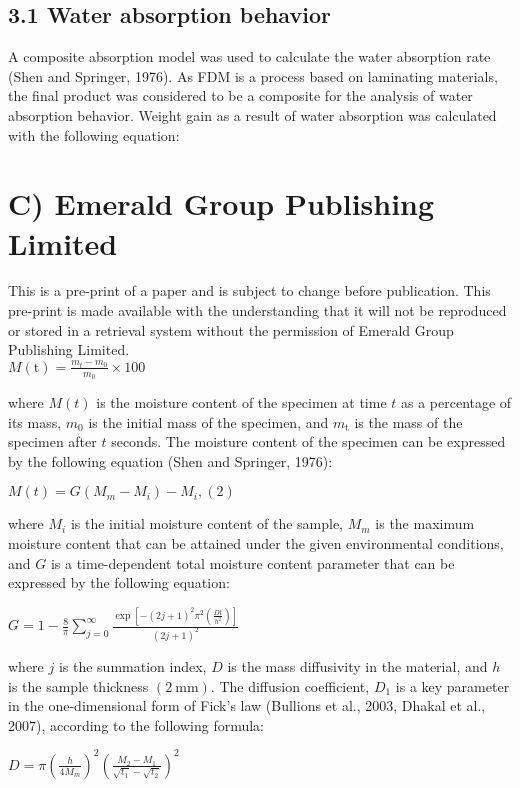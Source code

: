 \documentclass[10pt]{article}
\begin{document}
\subsection*{3.1 Water absorption behavior}
A composite absorption model was used to calculate the water absorption rate (Shen and Springer, 1976). As FDM is a process based on laminating materials, the final product was considered to be a composite for the analysis of water absorption behavior. Weight gain as a result of water absorption was calculated with the following equation:

\section*{C) Emerald Group Publishing Limited}
This is a pre-print of a paper and is subject to change before publication. This pre-print is made available with the understanding that it will not be reproduced or stored in a retrieval system without the permission of Emerald Group Publishing Limited.\\
$M(\mathrm{t})=\frac{m_{t}-m_{0}}{m_{0}} \times 100$

where $M(t)$ is the moisture content of the specimen at time $t$ as a percentage of its mass, $m_{0}$ is the initial mass of the specimen, and $m_{\mathrm{t}}$ is the mass of the specimen after $t$ seconds. The moisture content of the specimen can be expressed by the following equation (Shen and Springer, 1976):

$M(t)=G\left(M_{m}-M_{i}\right)-M_{i},(2)$

where $M_{i}$ is the initial moisture content of the sample, $M_{m}$ is the maximum moisture content that can be attained under the given environmental conditions, and $G$ is a time-dependent total moisture content parameter that can be expressed by the following equation:

$G=1-\frac{8}{\pi} \sum_{j=0}^{\infty} \frac{\exp \left[-(2 j+1)^{2} \pi^{2}\left(\frac{D t}{h^{2}}\right)\right]}{(2 j+1)^{2}}$

where $j$ is the summation index, $D$ is the mass diffusivity in the material, and $h$ is the sample thickness $(2 \mathrm{~mm})$. The diffusion coefficient, $D_{1}$ is a key parameter in the one-dimensional form of Fick's law (Bullions et al., 2003, Dhakal et al., 2007), according to the following formula:

$D=\pi\left(\frac{h}{4 M_{m}}\right)^{2}\left(\frac{M_{2}-M_{1}}{\sqrt{t_{1}}-\sqrt{t_{2}}}\right)^{2}$
\end{document}
